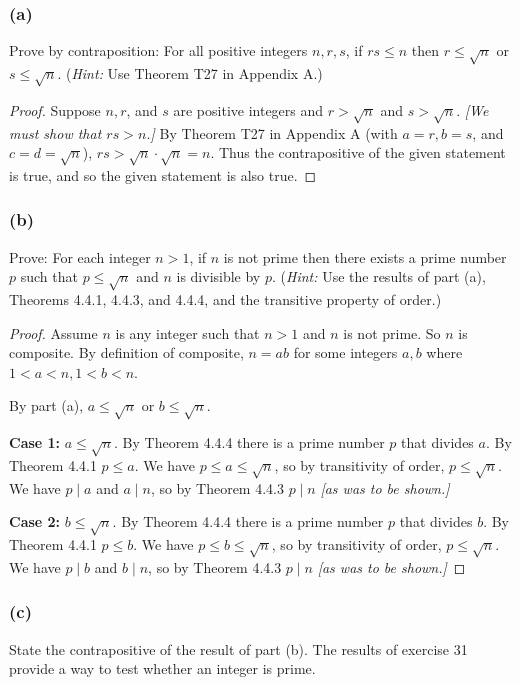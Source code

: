 \documentclass[14pt]{extarticle}
\begin{document}
\subsubsection{(a)}
Prove by contraposition: For all positive integers $n, r, s$, if $rs \leq n$ then $r \leq \sqrt{n}$ or $s \leq \sqrt{n}$. ({\it Hint:} Use Theorem T27 in Appendix A.)

\begin{proof}
    Suppose $n, r$, and $s$ are positive integers and $r > \sqrt{n}$ and $s > \sqrt{n}$. {\it [We must show that $rs > n$.]} By Theorem T27 in Appendix A (with $a = r, b = s$, and $c = d = \sqrt{n}$), $rs > \sqrt{n}\cdot\sqrt{n} = n$. Thus the contrapositive of the given statement is true, and so the given statement is also true.
\end{proof}

\subsubsection{(b)}
Prove: For each integer $n > 1$, if $n$ is not prime then there exists a prime number $p$ such that $p \leq \sqrt{n}$ and $n$ is divisible by $p$. ({\it Hint:} Use the results of part (a), Theorems 4.4.1, 4.4.3, and 4.4.4, and the transitive property of order.)

\begin{proof}
    Assume $n$ is any integer such that $n > 1$ and $n$ is not prime. So $n$ is composite. By definition of composite, $n = ab$ for some integers $a,b$ where $1 < a < n, 1 < b < n$.

    By part (a), $a \leq \sqrt{n}$ or $b \leq \sqrt{n}$.

        {\bf Case 1:} $a \leq \sqrt{n}$. By Theorem 4.4.4 there is a prime number $p$ that divides $a$. By Theorem 4.4.1 $p \leq a$. We have $p \leq a \leq \sqrt{n}$, so by transitivity of order, $p \leq \sqrt{n}$. We have $p \mid a$ and $a \mid n$, so by Theorem 4.4.3 $p \mid n$ {\it [as was to be shown.]}

        {\bf Case 2:} $b \leq \sqrt{n}$. By Theorem 4.4.4 there is a prime number $p$ that divides $b$. By Theorem 4.4.1 $p \leq b$. We have $p \leq b \leq \sqrt{n}$, so by transitivity of order, $p \leq \sqrt{n}$. We have $p \mid b$ and $b \mid n$, so by Theorem 4.4.3 $p \mid n$ {\it [as was to be shown.]}
\end{proof}

\subsubsection{(c)}
State the contrapositive of the result of part (b). The results of exercise 31 provide a way to test whether an integer is prime.
\end{document}
